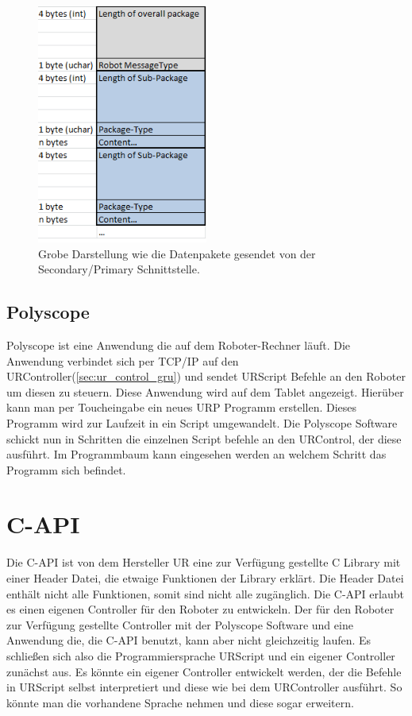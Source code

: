 \begin{figure}[H]
  \centering
    \includegraphics[width=0.5\textwidth]{pic/secondary_datapackage_scheme.png}
      \caption[Schema des Datenpakets gesendet von der Secondary Schnittstelle]{Grobe Darstellung wie die Datenpakete gesendet von der Secondary/Primary Schnittstelle.}
      \label{fig:datascheme_of_secondary_interface}
\end{figure}

\subsection{Polyscope}
\label{urcontrol_polyscope_gru}

Polyscope ist eine Anwendung die auf dem Roboter-Rechner läuft. Die Anwendung verbindet sich per \acs{TCP/IP} auf den URController(\ref{sec:ur_control_gru}) und sendet URScript Befehle an den Roboter um diesen zu steuern.
Diese Anwendung wird auf dem Tablet angezeigt. Hierüber kann man per Toucheingabe ein neues \acs{URP} Programm erstellen. Dieses Programm wird zur Laufzeit in ein Script umgewandelt. Die Polyscope Software schickt nun in Schritten die einzelnen Script befehle an den URControl, der diese ausführt. Im Programmbaum kann eingesehen werden an welchem Schritt das Programm sich befindet.

\section{C-API}
\label{sec:rest_prinzip_gru}

Die C-\ac{API} ist von dem Hersteller \acs{UR} eine zur Verfügung gestellte C \acs{Library} mit einer Header Datei, die etwaige Funktionen der Library erklärt. Die Header Datei enthält nicht alle Funktionen, somit sind nicht alle zugänglich. Die C-\acs{API} erlaubt es einen eigenen Controller für den Roboter zu entwickeln. Der für den Roboter zur Verfügung gestellte Controller mit der Polyscope Software und eine Anwendung die, die C-\acs{API} benutzt, kann aber nicht gleichzeitig laufen. Es schließen sich also die Programmiersprache URScript und ein eigener Controller zunächst aus. Es könnte ein eigener Controller entwickelt werden, der die Befehle in URScript selbst interpretiert und diese wie bei dem URController ausführt. So könnte man die vorhandene Sprache nehmen und diese sogar erweitern.

